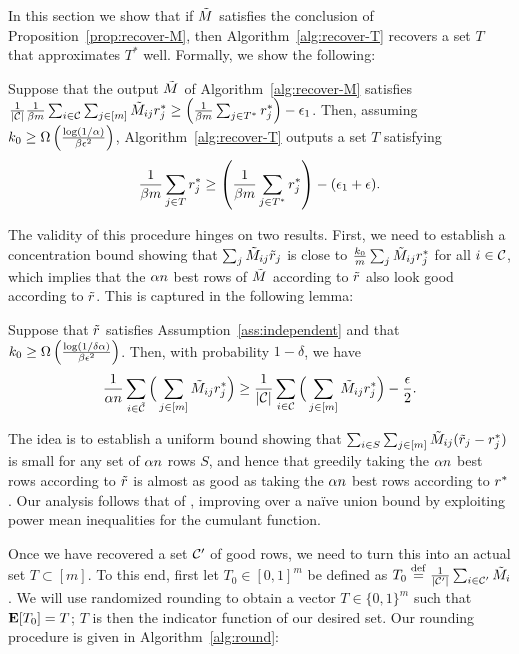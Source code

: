 In this section we show that if $\tilde{M}$ satisfies the conclusion of 
Proposition~\ref{prop:recover-M}, then Algorithm~\ref{alg:recover-T} 
recovers a set $T$ that approximates $T^*$ well. Formally, we show 
the following:
\begin{proposition}
\label{prop:recover-T}
Suppose that the output $\tilde{M}$ of Algorithm~\ref{alg:recover-M} satisfies 
$\frac{1}{|\mathcal{C}|} \frac{1}{\beta m}\sum_{i \in \mathcal{C}}\sum_{j \in [m]} \tilde{M}_{ij}r^*_j \geq \left( \frac{1}{\beta m} \sum_{j \in T^*} r^*_j \right) - \epsilon_1$. Then, 
assuming $k_0 \geq \Omega\left( \frac{\log(1/\alpha)}{\beta\epsilon^2} \right)$, 
Algorithm~\ref{alg:recover-T} outputs a set $T$ satisfying 
\begin{equation}
\label{eq:recover-T}
\frac{1}{\beta m}\sum_{j \in T} r^*_j \geq \left( \frac{1}{\beta m}\sum_{j \in T^*} r^*_j \right) - (\epsilon_1 + \epsilon).
\end{equation}
\end{proposition}
The validity of this procedure hinges on two results. First, we need to establish 
a concentration bound showing that $\sum_j \tilde{M}_{ij}\tilde{r}_j$ is close to 
$\frac{k_0}{m}\sum_j \tilde{M}_{ij}r^*_j$ for all $i \in \mathcal{C}$, which implies that 
the $\alpha n$ best rows of $\tilde{M}$ according to $\tilde{r}$ also look good 
according to $\tilde{r}$. This is captured in the following lemma:
\begin{lemma}
\label{lem:robs-rtrue}
Suppose that $\tilde{r}$ satisfies Assumption~\ref{ass:independent} and that 
$k_0 \geq \Omega\left( \frac{\log(1/\delta\alpha)}{\beta\epsilon^2} \right)$. 
Then, with probability $1-\delta$, we have
\begin{equation}
\label{eq:robs-rtrue}
\frac{1}{\alpha n} \sum_{i \in \tilde{\mathcal{C}}} \Big(\sum_{j \in [m]} \tilde{M}_{ij}r^*_j\Big) \geq \frac{1}{|\mathcal{C}|} \sum_{i \in \mathcal{C}} \Big(\sum_{j \in [m]} \tilde{M}_{ij}r^*_j\Big) - \frac{\epsilon}{2}.
\end{equation}
\end{lemma}
The idea is to establish a uniform bound showing that 
$\sum_{i \in S} \sum_{j \in [m]} \tilde{M}_{ij}(\tilde{r}_j - r^*_j)$ is small for any 
set of $\alpha n$ rows $S$, and hence that greedily taking the $\alpha n$ 
best rows according to $\tilde{r}$ is almost as good as taking the $\alpha n$ 
best rows according to $r^*$. Our analysis follows that of 
\citet{todo}, improving over a na\"{i}ve union bound by exploiting power mean 
inequalities for the cumulant function. 

Once we have recovered a set $\mathcal{C}'$ of good rows, we need to turn this 
into an actual set $T \subset [m]$. To this end, first let $T_0 \in [0,1]^m$ 
be defined as $T_0 \stackrel{\rm def}{=} \frac{1}{|\mathcal{C}'|} \sum_{i \in \mathcal{C}'} \tilde{M}_i$. 
We will use randomized rounding to obtain a vector $T \in \{0,1\}^m$ such that 
$\mathbf{E}[T_0] = T$; $T$ is then the indicator function of our desired set.
Our rounding procedure is given in Algorithm~\ref{alg:round}:

